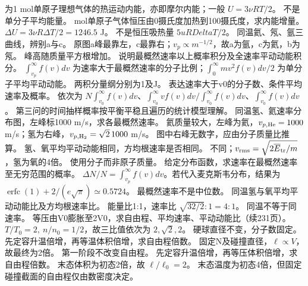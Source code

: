 \workings 为1 mol单原子理想气体的热运动内能，亦即摩尔内能；一般 $U=3\nu RT/2$。
\crosscheck 不是单分子平均能量。
 mol单原子气体恒压由0摄氏度加热到100摄氏度，求内能增量。
\workings $\Delta U=3\nu R\Delta T/2=1246.5$ J。
\crosscheck 不是恒压吸热量 $5
u RDelta T/2$。
\problemtext 同温氦、氖、氩三曲线，辨别a与c。
\workings 原图a峰最靠左，c最靠右；$v_p\propto m^{-1/2}$，故a为氩，c为氦，b为氖。
\crosscheck 峰高随质量平方根增加。
\problemtext 说明最概然速率以上概率积分及全速率平动动能积分。
\workings $\int_{v_p}^\infty f(v)dv$ 为速率大于最概然速率的分子比例；$\int_0^\infty mv^2 f(v)dv/2$ 为单分子平均平动动能。
\crosscheck 两积分量纲分别为1及J。
\problemtext 表达速率大于v0的分子数、条件平均速率及概率。
\workings 依次为 $N\int_{v_0}^\infty f(v)dv$、$\int_{v_0}^\infty vf(v)dv/\int_{v_0}^\infty f(v)dv$、$\int_{v_0}^\infty f(v)dv$。
\crosscheck 第三问的时间抽样概率按平衡平稳且遍历的统计模型理解。
\problemtext 同温氢、氦速率分布图，左峰标1000 m/s，求各最概然速率。
\workings 氦质量较大，左峰为氦，$v_{p,\rm He}=1000$ m/s；氢为右峰，$v_{p,\rm H_2}=\sqrt2\,1000$ m/s。
\crosscheck 图中右峰无数字，应由分子质量比推算。
\problemtext 氢、氧平均平动动能相同，方均根速率是否相同。
\workings 不同；$v_{\rm rms}=\sqrt{2\overline E_{\rm tr}/m}$，氢为氧的4倍。
\crosscheck 使用分子而非原子质量。
\problemtext 给定分布函数，求速率在最概然速率至无穷范围的概率。
\workings $\Delta N/N=\int_{v_p}^\infty f(v)dv$。若代入麦克斯韦分布，结果为 $\operatorname{erfc}(1)+2/(e\sqrt\pi)\simeq0.5724$。
\crosscheck 最概然速率不是中位数。
\problemtext 同温氢与氧平均平动动能比及方均根速率比。
\workings 能量比1:1，速率比 $\sqrt{32/2}:1=4:1$。
\crosscheck 同温不等于同速率。
\problemtext 等压由V0膨胀至2V0，求自由程、平均速率、平动动能比（续231页）。
\workings $T/T_0=2,\ n/n_0=1/2$，故三比值依次为 $2,\sqrt2,2$。
\crosscheck 硬球直径不变，分子数固定。
\problemtext 先定容升温倍增，再等温体积倍增，求自由程倍数。
\workings 固定N及碰撞直径，$\ell\propto V$，故最终为2倍。
\crosscheck 第一阶段不改变自由程。
\problemtext 先定容升温倍增，再等压体积倍增，求自由程倍数。
\workings 末态体积为初态2倍，故 $\ell/\ell_0=2$。
\crosscheck 末态温度为初态4倍，但固定碰撞截面的自由程仅由数密度决定。


